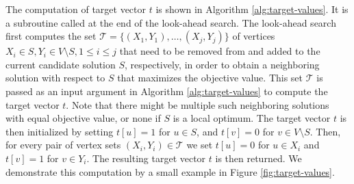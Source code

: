 \documentclass[draft,final]{vutinfth} %
\begin{document}
The computation of target vector $t$ is shown in Algorithm \ref{alg:target-values}. It is a subroutine called at the end of the look-ahead search. 
The look-ahead search first computes the set $\mathcal{T} = \{(X_1, Y_1), \dots, (X_j, Y_j)\}$ of vertices $X_i \in S, Y_i \in V \setminus S, 1 \leq i \leq j$ that need to be removed from and added to the current candidate solution $S$, respectively, in order to obtain a neighboring solution with respect to $S$ that maximizes the objective value. This set $\mathcal{T}$ is passed as an input argument in Algorithm \ref{alg:target-values} to compute the target vector $t$.   
Note that there might be multiple such neighboring solutions with equal objective value, or none if $S$ is a local optimum. 
The target vector $t$ is then initialized by setting $t[u] = 1$ for $u \in S$, and $t[v] = 0$ for $v \in V \setminus S$. Then, for every pair of vertex sets $(X_i, Y_i) \in \mathcal{T}$ we set $t[u] = 0$ for $u \in X_i$ and $t[v] = 1$ for $v \in Y_i$. The resulting target vector $t$ is then returned. 
We demonstrate this computation by a small example in Figure \ref{fig:target-values}. 

\end{document}
